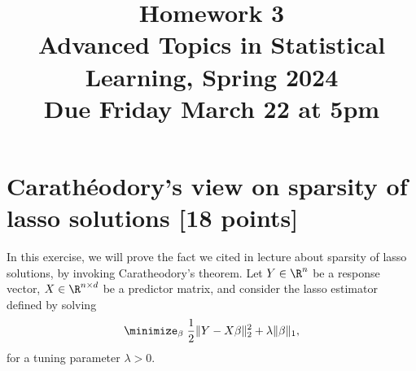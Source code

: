 \documentclass{article}
\title{Homework 3 \\ \smallskip
\large Advanced Topics in Statistical Learning, Spring 2024 \\ \smallskip
Due Friday March 22 at 5pm}
\date{}
\begin{document}
\maketitle
\RaggedRight
\vspace{-50pt}

\section{Carath\'{e}odory's view on sparsity of lasso solutions [18 points]} 

In this exercise, we will prove the fact we cited in lecture about sparsity of
lasso solutions, by invoking Caratheodory's theorem. Let $Y \in \R^n$ be a
response vector, $X \in \R^{n \times d}$ be a predictor matrix, and consider
the lasso estimator defined by solving
\[
\minimize_\beta \; \frac{1}{2} \|Y - X\beta\|_2^2 + \lambda \|\beta\|_1,
\]
for a tuning parameter $\lambda > 0$.
\end{document}
